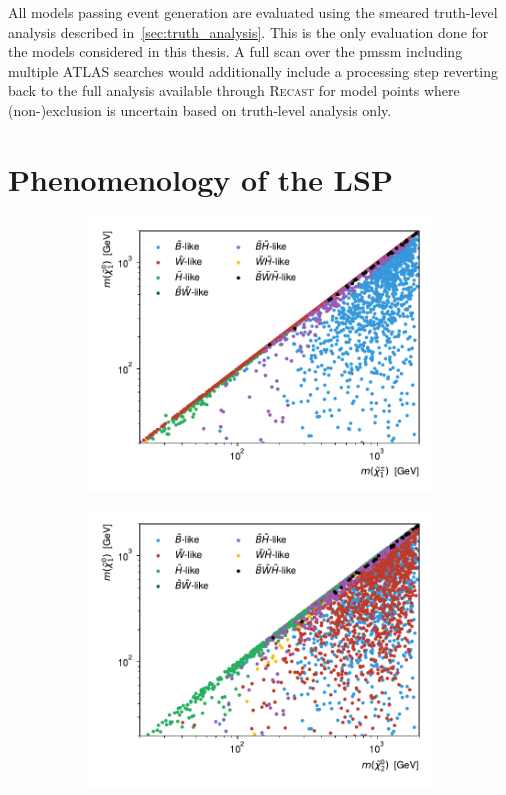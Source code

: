 All models passing event generation are evaluated using the smeared truth-level analysis described in~\cref{sec:truth_analysis}. This is the only evaluation done for the models considered in this thesis. A full scan over the \gls{pmssm} including multiple ATLAS searches would additionally include a processing step reverting back to the full analysis available through \textsc{Recast} for model points where (non-)exclusion is uncertain based on truth-level analysis only.

\section{Phenomenology of the LSP}\label{sec:lsp_pheno}

 \begin{figure}
	\centering
	\begin{subfigure}[b]{0.5\linewidth}
		\centering\includegraphics[width=\textwidth]{scatter/lsp_types.pdf}
		\caption{\label{fig:lsp_types}}
	\end{subfigure}\hfill
	\begin{subfigure}[b]{0.5\linewidth}
		\centering\includegraphics[width=\textwidth]{scatter/lsp_types_N2.pdf}

\end{subfigure}
\end{figure}
